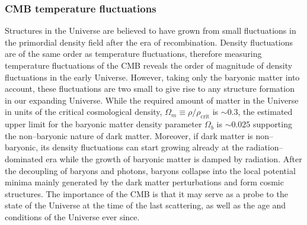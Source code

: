 \documentclass[paper=a4, fontsize=11pt]{scrartcl} %
\numberwithin{equation}{section} %
\numberwithin{figure}{section} %
\numberwithin{table}{section} %
\newcommand{\ignore}[1]{}
\begin{document}



\subsubsection{CMB temperature fluctuations}
\label{subsec:CMB}
\ignore{One very convincing evidence for the presence and amount of dark matter in our Universe is from the fluctuations of the CMB. Quote the cosmological density fractions for dark matter, baryon, and the Hubble constant for the latest Planck paper.}
Structures in the Universe are believed to have grown from small fluctuations in the primordial density field after the era of recombination. Density fluctuations are of the same order as temperature fluctuations\ignore{ ({\bf cite!}) \bf why? look back in the structure formation part!}, therefore measuring temperature fluctuations of the CMB reveals the order of magnitude of density fluctuations in the early Universe. However, taking only the baryonic matter into account, these fluctuations are two small to give rise to any structure formation in our expanding Universe. While the required amount of matter in the Universe in units of the critical cosmological density, $\Omega_m \equiv \rho/\rho_\mathrm{crit}$ is $\sim 0.3$, the estimated upper limit for the baryonic matter density parameter $\Omega_b$ is $ \sim 0.025$ \citep[][]{Planck2015} supporting the non--baryonic nature of dark matter. Moreover, if dark matter is non--baryonic, its density fluctuations can start growing already at the radiation--dominated era while the growth of baryonic matter is damped by radiation. After the decoupling of baryons and photons, baryons collapse into the local potential minima mainly generated by the dark matter perturbations and form cosmic structures. The importance of the CMB is that it may serve as a probe to the state of the Universe at the time of the last scattering, as well as the age and conditions of the Universe ever since.
\end{document}
